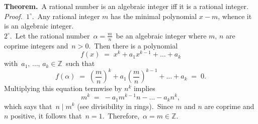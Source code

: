 \documentclass[12pt]{article}
\theoremstyle{definition}
\begin{document}
\textbf{Theorem.}\, A rational number is an algebraic integer iff it is a rational integer.\\

\emph{Proof.}\, $1^\circ$.\, Any rational integer $m$ has the minimal polynomial $x\!-\!m$, whence it is an algebraic integer.\\
$2^\circ$.\, Let the rational number\, $\alpha = \frac{m}{n}$\, be an algebraic integer where $m,\,n$ are coprime integers and\, $n > 0$.\, Then there is a polynomial
$$f(x) \;=\; x^k+a_1x^{k-1}+\ldots+a_k$$
with\, $a_1,\,\ldots,\,a_k \in \mathbb{Z}$\, such that
$$f(\alpha) \;=\; \left(\frac{m}{n}\right)^k+a_1\left(\frac{m}{n}\right)^{k-1}+\ldots+a_k \;=\; 0.$$
Multiplying this equation termwise by $n^k$ implies
$$m^k \;=\; -a_1m^{k-1}n-\ldots-a_kn^k,$$
which says that\, $n \mid m^k$ (see divisibility in rings).\, Since $m$ and $n$ are coprime and $n$ positive, it follows that\, $n = 1$.\, Therefore,\, $\alpha = m \in \mathbb{Z}$.

\end{document}
